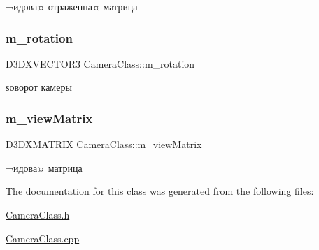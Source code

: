 ¬идова¤ отраженна¤ матрица 

\mbox{\label{class_camera_class_a2e9904935aa83c05d1974bc1fc5fd882}} 
\subsubsection{\texorpdfstring{m\+\_\+rotation}{m\_rotation}}
{\footnotesize\ttfamily D3\+D\+X\+V\+E\+C\+T\+O\+R3 Camera\+Class\+::m\+\_\+rotation\hspace{0.3cm}{\ttfamily [private]}}



ѕоворот камеры 

\mbox{\label{class_camera_class_a6b3258f072a57473bd4842a9d51677c8}} 
\subsubsection{\texorpdfstring{m\+\_\+view\+Matrix}{m\_viewMatrix}}
{\footnotesize\ttfamily D3\+D\+X\+M\+A\+T\+R\+IX Camera\+Class\+::m\+\_\+view\+Matrix\hspace{0.3cm}{\ttfamily [private]}}



¬идова¤ матрица 



The documentation for this class was generated from the following files\+:\begin{DoxyCompactItemize}
\item 
\hyperlink{_camera_class_8h}{Camera\+Class.\+h}\item 
\hyperlink{_camera_class_8cpp}{Camera\+Class.\+cpp}\end{DoxyCompactItemize}
